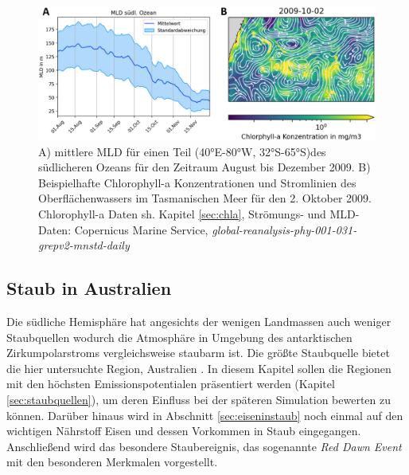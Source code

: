 \documentclass[12pt,a4paper,onecolumn]{scrartcl}
\begin{document}
\begin{figure}
\includegraphics[width=\textwidth]{bilder/mld_currents.png}
\caption{A) mittlere MLD für einen Teil (40°E-80°W, 32°S-65°S)des südlicheren Ozeans für den Zeitraum August bis Dezember 2009. B) Beispielhafte Chlorophyll-a Konzentrationen und Stromlinien des Oberflächenwassers im Tasmanischen Meer für den 2. Oktober 2009. Chlorophyll-a Daten sh. Kapitel \ref{sec:chla}, Strömungs- und MLD-Daten: Copernicus Marine Service, \textit{global-reanalysis-phy-001-031-grepv2-mnstd-daily} } \label{fig:mld_currents}
\end{figure}
\subsection{Staub in Australien} \label{sec:Staub}
Die südliche Hemisphäre hat angesichts der wenigen Landmassen auch weniger Staubquellen wodurch die Atmosphäre in Umgebung des antarktischen Zirkumpolarstroms vergleichsweise staubarm ist. Die größte Staubquelle bietet die hier untersuchte Region, Australien \citep{Shao.2011}. In diesem Kapitel sollen die Regionen mit den höchsten Emissionspotentialen präsentiert werden (Kapitel \ref{sec:staubquellen}), um deren Einfluss bei der späteren Simulation bewerten zu können. Darüber hinaus wird in Abschnitt \ref{sec:eiseninstaub} noch einmal auf den wichtigen Nährstoff Eisen und dessen Vorkommen in Staub eingegangen. Anschließend wird das besondere Staubereignis, das sogenannte \textit{Red Dawn Event} mit den besonderen Merkmalen vorgestellt.
\end{document}
